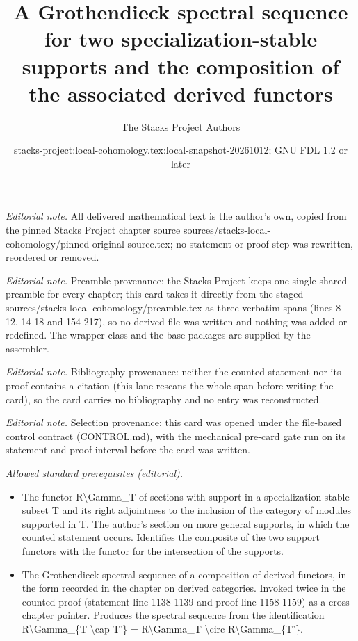 \documentclass[10pt,a4paper]{amsart}
\title{A Grothendieck spectral sequence for two specialization-stable supports and the composition of the associated derived functors}
\author{The Stacks Project Authors}
\date{stacks-project:local-cohomology.tex:local-snapshot-20261012; GNU FDL 1.2 or later}
\theoremstyle{plain}
\theoremstyle{definition}
\theoremstyle{remark}
\numberwithin{equation}{subsection}
\begin{document}
\maketitle
\noindent\textit{Editorial note.} All delivered mathematical text is the author's own, copied from the pinned Stacks Project chapter source sources/stacks-local-cohomology/pinned-original-source.tex; no statement or proof step was rewritten, reordered or removed.\par\medskip
\noindent\textit{Editorial note.} Preamble provenance: the Stacks Project keeps one single shared preamble for every chapter; this card takes it directly from the staged sources/stacks-local-cohomology/preamble.tex as three verbatim spans (lines 8-12, 14-18 and 154-217), so no derived file was written and nothing was added or redefined. The wrapper class and the base packages are supplied by the assembler.\par\medskip
\noindent\textit{Editorial note.} Bibliography provenance: neither the counted statement nor its proof contains a citation (this lane rescans the whole span before writing the card), so the card carries no bibliography and no entry was reconstructed.\par\medskip
\noindent\textit{Editorial note.} Selection provenance: this card was opened under the file-based control contract (CONTROL.md), with the mechanical pre-card gate run on its statement and proof interval before the card was written.\par\medskip
\noindent\textit{Allowed standard prerequisites (editorial).}\begin{itemize}
\item The functor R\textbackslash{}Gamma\_T of sections with support in a specialization-stable subset T and its right adjointness to the inclusion of the category of modules supported in T. The author's section on more general supports, in which the counted statement occurs. Identifies the composite of the two support functors with the functor for the intersection of the supports.
\item The Grothendieck spectral sequence of a composition of derived functors, in the form recorded in the chapter on derived categories. Invoked twice in the counted proof (statement line 1138-1139 and proof line 1158-1159) as a cross-chapter pointer. Produces the spectral sequence from the identification R\textbackslash{}Gamma\_\{T \textbackslash{}cap T'\} = R\textbackslash{}Gamma\_T \textbackslash{}circ R\textbackslash{}Gamma\_\{T'\}.
\end{itemize}\medskip
\end{document}
